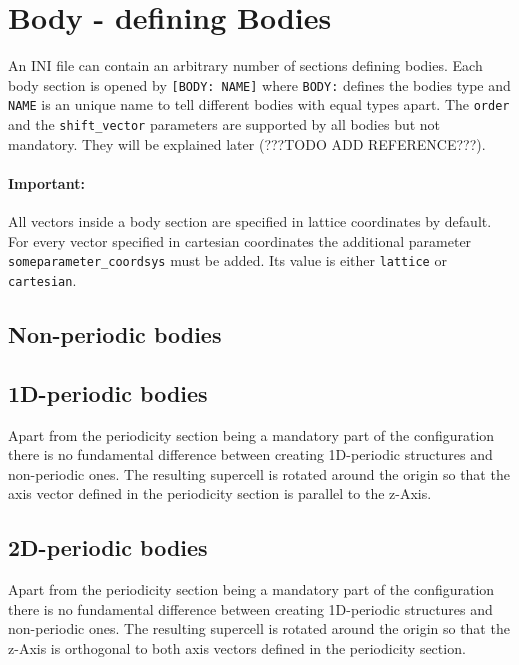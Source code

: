\section{Body - defining Bodies}

An INI file can contain an arbitrary number of sections defining bodies. Each body section is opened by \lstinline{[BODY: NAME]} where \lstinline{BODY:} defines the bodies type and \lstinline{NAME} is an unique name to tell different bodies with equal types apart. The \lstinline{order} and the \lstinline{shift_vector} parameters are supported by all bodies but not mandatory. They will be explained later (???TODO ADD REFERENCE???).

\paragraph{Important:} All vectors inside a body section are specified in lattice coordinates by default. For every vector specified in cartesian coordinates the additional parameter \lstinline{someparameter_coordsys} must be added. Its value is either \lstinline{lattice} or \lstinline{cartesian}.

\subsection{Non-periodic bodies}



\subsection{1D-periodic bodies}
Apart from the periodicity section being a mandatory part of the configuration there is no fundamental difference between creating 1D-periodic structures and non-periodic ones. The resulting supercell is rotated around the origin so that the axis vector defined in the periodicity section is parallel to the z-Axis.




\subsection{2D-periodic bodies}

Apart from the periodicity section being a mandatory part of the configuration there is no fundamental difference between creating 1D-periodic structures and non-periodic ones. The resulting supercell is rotated around the origin so that the z-Axis is orthogonal to both axis vectors defined in the periodicity section.


